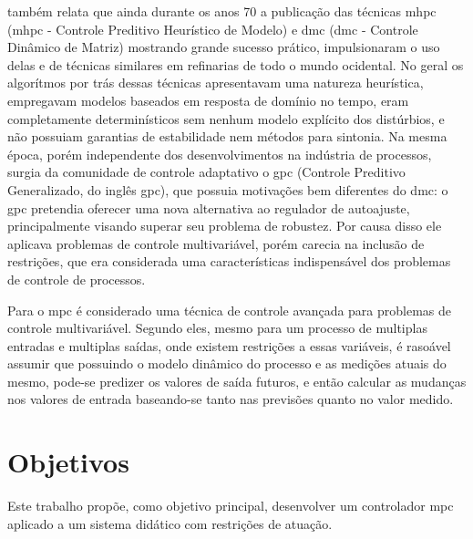  também relata que ainda durante os anos 70 a publicação das técnicas
\acrlong{mhpc} (\acrshort{mhpc} - Controle Preditivo Heurístico de Modelo) e
\acrlong{dmc} (\acrshort{dmc} - Controle Dinâmico de Matriz) mostrando grande sucesso prático,
impulsionaram o uso delas e de técnicas similares em refinarias de todo o mundo ocidental.
No geral os algorítmos por trás dessas técnicas apresentavam uma natureza heurística,
empregavam modelos baseados em resposta de domínio no tempo, eram completamente determinísticos
sem nenhum modelo explícito dos distúrbios, e não possuiam garantias de estabilidade nem
métodos para sintonia. Na mesma época, porém independente dos desenvolvimentos na indústria
de processos, surgia da comunidade de controle adaptativo o \acrshort{gpc} (Controle Preditivo
Generalizado, do inglês \acrlong{gpc}), que possuia motivações bem diferentes do \acrshort{dmc}:
o \acrshort{gpc} pretendia oferecer uma nova alternativa ao regulador de autoajuste, %
principalmente visando superar seu problema de robustez. Por causa disso ele aplicava problemas de controle
multivariável, porém carecia na inclusão de restrições, que era considerada uma características
indispensável dos problemas de controle de processos.



Para  o \acrlong{mpc} é considerado uma técnica de controle
avançada para problemas de controle multivariável. Segundo eles, mesmo para um processo
de multiplas entradas e multiplas saídas, onde existem restrições a essas variáveis,
é rasoável assumir que possuindo o modelo dinâmico do processo e as medições atuais do
mesmo, pode-se predizer os valores de saída futuros, e então calcular as mudanças nos
valores de entrada baseando-se tanto nas previsões quanto no valor medido.



\section{Objetivos}
\label{sec:objetivos}

Este trabalho propõe, como objetivo principal, desenvolver um controlador \acrshort{mpc}
aplicado a um sistema didático com restrições de atuação.


